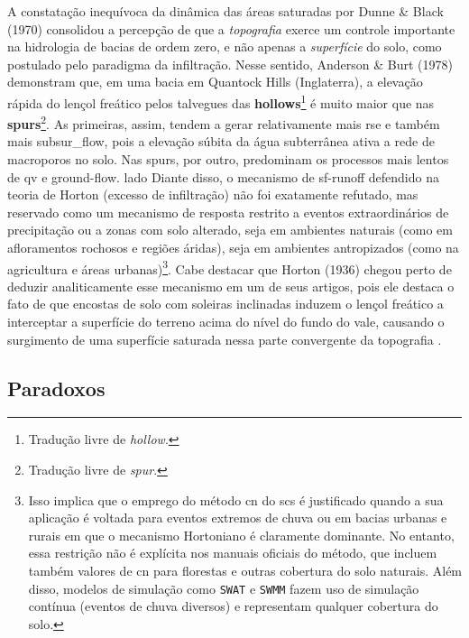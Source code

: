\documentclass[./main.tex]{subfiles}
\begin{document}
\par A constatação inequívoca da dinâmica das áreas saturadas por Dunne \& Black (1970) consolidou a percepção de que a \textit{topografia} exerce um controle importante na hidrologia de bacias de ordem zero, e não apenas a \textit{superfície} do solo, como postulado pelo \gls{paradigma} da infiltração. Nesse sentido, Anderson \& Burt (1978) \cite{Anderson1978} demonstram que, em uma bacia em Quantock Hills (Inglaterra), a elevação rápida do lençol freático pelos talvegues das \textbf{\gls{hollows}}\footnote{Tradução livre de \textit{hollow}.} é muito maior que nas \textbf{\gls{spurs}}\footnote{Tradução livre de \textit{spur}.}. As primeiras, assim, tendem a gerar relativamente mais \gls{rse} e também mais \gls{subsur_flow}, pois a elevação súbita da água subterrânea ativa a rede de macroporos no solo. Nas \gls{spurs}, por outro, predominam os processos mais lentos de \gls{qv} e \gls{ground-flow}. lado Diante disso, o mecanismo de \gls{sf-runoff} defendido na \gls{teoria} de Horton (excesso de infiltração) não foi exatamente refutado, mas reservado como um mecanismo de resposta restrito a eventos extraordinários de precipitação ou a zonas com solo alterado, seja em ambientes naturais (como em afloramentos rochosos e regiões áridas), seja em ambientes antropizados (como na agricultura e áreas urbanas)\footnote{Isso implica que o emprego do método \acrshort{cn} do \acrshort{scs} é justificado quando a sua aplicação é voltada para eventos extremos de chuva ou em bacias urbanas e rurais em que o mecanismo Hortoniano é claramente dominante. No entanto, essa restrição não é explícita nos manuais oficiais do método, que incluem também valores de \acrshort{cn} para florestas e outras cobertura do solo naturais. Além disso, modelos de simulação como \texttt{SWAT} e \texttt{SWMM} fazem uso de simulação contínua (eventos de chuva diversos) e representam qualquer cobertura do solo.}. Cabe destacar que Horton (1936) \cite{Horton1936} chegou perto de deduzir analiticamente esse mecanismo em um de seus artigos, pois ele destaca o fato de que encostas de solo com soleiras inclinadas induzem o lençol freático a interceptar a superfície do terreno acima do nível do fundo do vale, causando o surgimento de uma superfície saturada nessa parte convergente da topografia \cite{Beven2004b}.

\subsection{Paradoxos}
\end{document}
